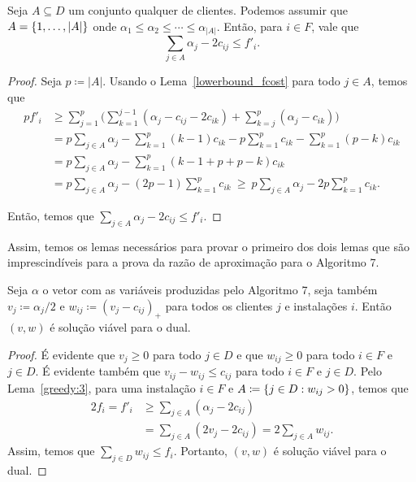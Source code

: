 \begin{lemma}
\label{greedy:3}
Seja $A \subseteq D$ um conjunto qualquer de clientes. Podemos assumir que $A = \{1,\ldots,|A|\}$ onde $\alpha_1 \leq \alpha_2 \leq \cdots \leq \alpha_{|A|}$. Então, para $i \in F$, vale que
\[ \sum_{j \in A}\alpha_j - 2c_{ij} \leq f'_i.
\]
\end{lemma}
\begin{proof}
Seja $p \coloneqq |A|$. Usando o Lema~\ref{lowerbound_fcost} para todo $j \in A$, temos que
\begin{subequations}
\begin{align*}
  p f'_i &\geq \sum_{j=1}^p {\big (} \sum_{k=1}^{j-1} (\alpha_j - c_{ij} - 2c_{ik}) + \sum_{k=j}^p (\alpha_j - c_{ik}) {\big )} \\
  &= p\sum_{j \in A}\alpha_j - \sum_{k=1}^p (k-1)c_{ik} - p\sum_{k=1}^p c_{ik} - \sum_{k=1}^p (p-k) c_{ik} \\
  &= p\sum_{j \in A}\alpha_j - \sum_{k=1}^p (k-1+p+p-k)c_{ik} \\
  &= p\sum_{j \in A}\alpha_j - (2p -1 )\sum_{k=1}^p c_{ik} \ \geq \ p\sum_{j \in A}\alpha_j - 2p\sum_{k=1}^p c_{ik}.
\end{align*}
\end{subequations}

Então, temos que $\sum_{j \in A}\alpha_j - 2c_{ij} \leq f'_i$.

\end{proof}

Assim, temos os lemas necessários para provar o primeiro dos dois lemas que são imprescindíveis para a prova da razão de aproximação para o Algoritmo 7.

\begin{lemma}
\label{greedy:4}
Seja $\alpha$ o vetor com as variáveis produzidas pelo Algoritmo 7, seja também $v_j \coloneqq \alpha_j/2$ e $w_{ij} \coloneqq (v_j - c_{ij})_+$ para todos os clientes $j$ e instalações $i$. Então $(v,w)$ é solução viável para o dual. 
\end{lemma}

\begin{proof}
É evidente que $v_j \geq 0$ para todo $j \in D$ e que $w_{ij} \geq 0$ para todo $i \in F$ e $j \in D$. É evidente também que $v_{ij} - w_{ij} \leq c_{ij}$ para todo $i \in F$ e $j \in D$. Pelo Lema~\ref{greedy:3}, para uma instalação $i\in F$ e $A \coloneqq \{j \in D: w_{ij} > 0\}$, temos que
\begin{subequations}
\begin{align*}
2 f_i = f'_i &\geq \sum_{j \in A} (\alpha_j - 2c_{ij}) \\
 &= \sum_{j \in A}(2v_j - 2c_{ij}) = 2 \sum_{j \in A} w_{ij}.
\end{align*}
\end{subequations}
Assim, temos que $\sum_{j \in D} w_{ij} \leq f_i$. Portanto, $(v,w)$ é solução viável para o dual.
\end{proof}


